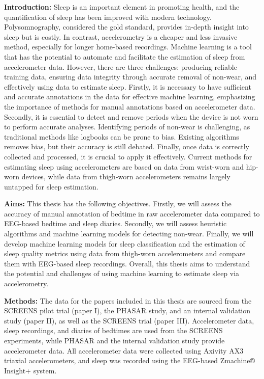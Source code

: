 \documentclass[
  10pt,
]{scrbook}
\let\originaltextbf\textbf
\renewcommand{\textbf}[1]{\textcolor{color1}{\originaltextbf{#1}}}
\begin{document}
\textbf{Introduction:} Sleep is an important element in promoting
health, and the quantification of sleep has been improved with modern
technology. Polysomnography, considered the gold standard, provides
in-depth insight into sleep but is costly. In contrast, accelerometry is
a cheaper and less invasive method, especially for longer home-based
recordings. Machine learning is a tool that has the potential to
automate and facilitate the estimation of sleep from accelerometer data.
However, there are three challenges: producing reliable training data,
ensuring data integrity through accurate removal of non-wear, and
effectively using data to estimate sleep. Firstly, it is necessary to
have sufficient and accurate annotations in the data for effective
machine learning, emphasizing the importance of methods for manual
annotations based on accelerometer data. Secondly, it is essential to
detect and remove periods when the device is not worn to perform
accurate analyses. Identifying periods of non-wear is challenging, as
traditional methods like logbooks can be prone to bias. Existing
algorithms removes bias, but their accuracy is still debated. Finally,
once data is correctly collected and processed, it is crucial to apply
it effectively. Current methods for estimating sleep using
accelerometers are based on data from wrist-worn and hip-worn devices,
while data from thigh-worn accelerometers remains largely untapped for
sleep estimation.

\textbf{Aims:} This thesis has the following objectives. Firstly, we
will assess the accuracy of manual annotation of bedtime in raw
accelerometer data compared to EEG-based bedtime and sleep diaries.
Secondly, we will assess heuristic algorithms and machine learning
models for detecting non-wear. Finally, we will develop machine learning
models for sleep classification and the estimation of sleep quality
metrics using data from thigh-worn accelerometers and compare them with
EEG-based sleep recordings. Overall, this thesis aims to understand the
potential and challenges of using machine learning to estimate sleep via
accelerometry.

\textbf{Methods:} The data for the papers included in this thesis are
sourced from the SCREENS pilot trial (paper I), the PHASAR study, and an
internal validation study (paper II), as well as the SCREENS trial
(paper III). Accelerometer data, sleep recordings, and diaries of
bedtimes are used from the SCREENS experiments, while PHASAR and the
internal validation study provide accelerometer data. All accelerometer
data were collected using Axivity AX3 triaxial accelerometers, and sleep
was recorded using the EEG-based Zmachine® Insight+ system.
\end{document}
